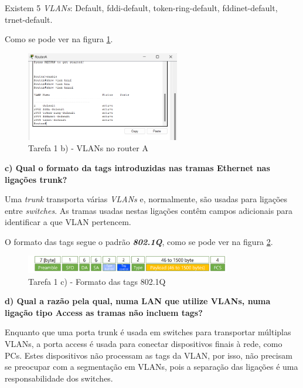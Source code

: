 \documentclass[11pt,english, openright, oneside]{book}
\begin{document}
Existem 5 \textit{VLANs}: Default, fddi-default, token-ring-default,
fddinet-default, trnet-default.

Como se pode ver na figura \ref{fig:1b}.
\vspace{0.4cm}

\begin{figure}[htp]
    \centering
    \includegraphics[width=0.6\textwidth]{imagens/Tarefa1/1.b.png}
    \caption{Tarefa 1 b) - VLANs no router A}
    \label{fig:1b}
\end{figure}

\vspace{0.8cm}


\pagebreak
\textbf{c) Qual o formato da tags introduzidas nas tramas Ethernet nas ligações trunk?}
\vspace{0.2cm}

Uma \textit{trunk} transporta várias \textit{VLANs} e, normalmente, são usadas
para ligações entre \textit{switches}. As tramas usadas nestas ligações contêm
campos adicionais para identificar a que VLAN pertencem.

O formato das tags segue o padrão \textit{\textbf{802.1Q}}, como se pode ver na
figura \ref{fig:1c}.
\vspace{0.4cm}

\begin{figure}[htp]
    \centering
    \includegraphics[width=0.8\textwidth]{imagens/Tarefa1/1.c.png}
    \caption{Tarefa 1 c) - Formato das tags 802.1Q}
    \label{fig:1c}
\end{figure} 

\vspace{0.8cm}


\textbf{d) Qual a razão pela qual, numa LAN que utilize VLANs, numa ligação tipo Access as tramas não incluem tags?}
\vspace{0.2cm}

Enquanto que uma porta trunk é usada em switches para transportar múltiplas
VLANs, a porta access é usada para conectar dispositivos finais à rede, como
PCs. Estes dispositivos não processam as tags da VLAN, por isso, não precisam se
preocupar com a segmentação em VLANs, pois a separação das ligações é uma
responsabilidade dos switches.
\vspace{0.8cm}
\end{document}
